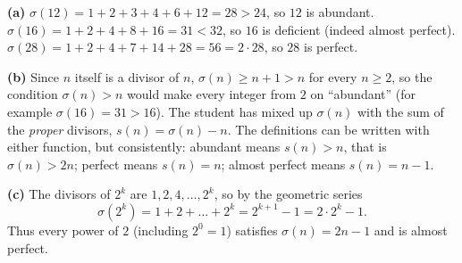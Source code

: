 \textbf{(a)} $\sigma(12)=1+2+3+4+6+12=28>24$, so $12$ is abundant. $\sigma(16)=1+2+4+8+16=31<32$, so $16$ is deficient (indeed almost perfect). $\sigma(28)=1+2+4+7+14+28=56=2\cdot28$, so $28$ is perfect.

\textbf{(b)} Since $n$ itself is a divisor of $n$, $\sigma(n)\ge n+1>n$ for every $n\ge2$, so the condition $\sigma(n)>n$ would make every integer from $2$ on ``abundant'' (for example $\sigma(16)=31>16$). The student has mixed up $\sigma(n)$ with the sum of the \emph{proper} divisors, $s(n)=\sigma(n)-n$. The definitions can be written with either function, but consistently: abundant means $s(n)>n$, that is $\sigma(n)>2n$; perfect means $s(n)=n$; almost perfect means $s(n)=n-1$.

\textbf{(c)} The divisors of $2^k$ are $1,2,4,\dots,2^k$, so by the geometric series
\[
\sigma(2^k)=1+2+\dots+2^k=2^{k+1}-1=2\cdot2^k-1 .
\]
Thus every power of $2$ (including $2^0=1$) satisfies $\sigma(n)=2n-1$ and is almost perfect.
